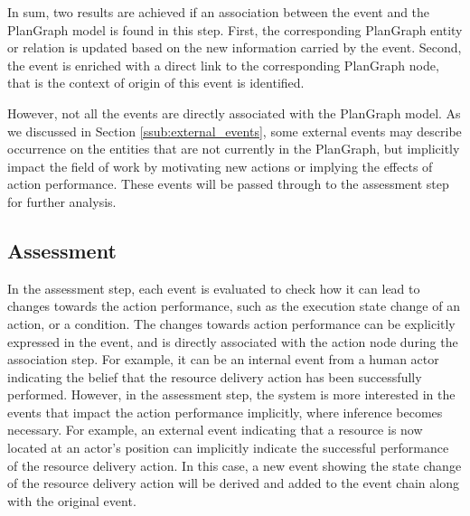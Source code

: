 In sum, two results are achieved if an association between the event and the PlanGraph model is found in this step. First, the corresponding PlanGraph entity or relation is updated based on the new information carried by the event. Second, the event is enriched with a direct link to the corresponding PlanGraph node, that is the context of origin of this event is identified. 

However, not all the events are directly associated with the PlanGraph model. As we discussed in Section \ref{ssub:external_events}, some external events may describe occurrence on the entities that are not currently in the PlanGraph, but implicitly impact the field of work by motivating new actions or implying the effects of action performance. These events will be passed through to the assessment step for further analysis. 

\subsection{Assessment} %
\label{sub:assessment}
In the assessment step, each event is evaluated to check how it can lead to changes towards the action performance, such as the execution state change of an action, or a condition. The changes towards action performance can be explicitly expressed in the event, and is directly associated with the action node during the association step. For example, it can be an internal event from a human actor indicating the belief that the resource delivery action has been successfully performed. However, in the assessment step, the system is more interested in the events that impact the action performance implicitly, where inference becomes necessary. For example, an external event indicating that a resource is now located at an actor's position can implicitly indicate the successful performance of the resource delivery action. In this case, a new event showing the state change of the resource delivery action will be derived and added to the event chain along with the original event.

